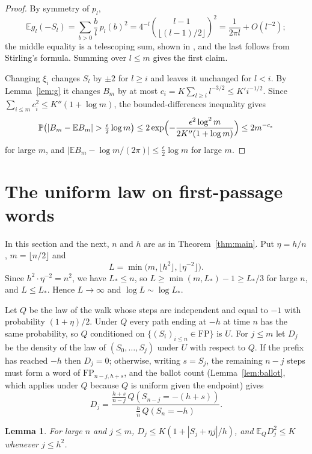\documentclass[11pt]{amsart}
\newtheorem{lemma}[theorem]{Lemma}
\theoremstyle{remark}
\numberwithin{equation}{section}
\newcommand{\PP}{\mathbb{P}}
\newcommand{\EE}{\mathbb{E}}
\newcommand{\FP}{\mathrm{FP}}
\begin{document}
\begin{proof}
By symmetry of $p_l$,
\[
\EE g_l(-S_l)=\sum_{b>0}\frac bl\,p_l(b)^2=4^{-l}\binom{l-1}{\lfloor(l-1)/2\rfloor}^2=\frac1{2\pi l}+O(l^{-2});
\]
the middle equality is a telescoping sum, shown in \cite[Lemma~3.1]{Sh26}, and the last follows from Stirling's formula. Summing over $l\le m$ gives the first claim.

Changing $\xi_i$ changes $S_l$ by $\pm2$ for $l\ge i$ and leaves it unchanged for $l<i$. By Lemma~\ref{lem:g} it changes $B_m$ by at most $c_i=K\sum_{l\ge i}l^{-3/2}\le K'i^{-1/2}$. Since $\sum_{i\le m}c_i^2\le K''(1+\log m)$, the bounded-differences inequality \cite{McD89} gives
\[
\PP\bigl(|B_m-\EE B_m|>\tfrac\epsilon2\log m\bigr)\le2\exp\Bigl(-\frac{\epsilon^2\log^2m}{2K''(1+\log m)}\Bigr)\le2m^{-c_\epsilon}
\]
for large $m$, and $|\EE B_m-\log m/(2\pi)|\le\frac\epsilon2\log m$ for large $m$.
\end{proof}


\section{The uniform law on first-passage words}\label{sec:prefix}

In this section and the next, $n$ and $h$ are as in Theorem~\ref{thm:main}. Put $\eta=h/n$, $m=\lfloor n/2\rfloor$ and
\[
L=\min\bigl(m,\lfloor h^2\rfloor,\lfloor\eta^{-2}\rfloor\bigr).
\]
Since $h^2\cdot\eta^{-2}=n^2$, we have $L_*\le n$, so $L\ge\min(m,L_*)-1\ge L_*/3$ for large $n$, and $L\le L_*$. Hence $L\to\infty$ and $\log L\sim\log L_*$.

Let $Q$ be the law of the walk whose steps are independent and equal to $-1$ with probability $(1+\eta)/2$. Under $Q$ every path ending at $-h$ at time $n$ has the same probability, so $Q$ conditioned on $\{(S_i)_{i\le n}\in\FP\}$ is $U$. For $j\le m$ let $D_j$ be the density of the law of $(S_0,\dots,S_j)$ under $U$ with respect to $Q$. If the prefix has reached $-h$ then $D_j=0$; otherwise, writing $s=S_j$, the remaining $n-j$ steps must form a word of $\FP_{n-j,h+s}$, and the ballot count (Lemma~\ref{lem:ballot}, which applies under $Q$ because $Q$ is uniform given the endpoint) gives
\begin{equation}\label{eq:density}
D_j=\frac{\frac{h+s}{n-j}\,Q(S_{n-j}=-(h+s))}{\frac hn\,Q(S_n=-h)}.
\end{equation}

\begin{lemma}\label{lem:D}
For large $n$ and $j\le m$, $D_j\le K(1+|S_j+\eta j|/h)$, and $\EE_QD_j^2\le K$ whenever $j\le h^2$.
\end{lemma}
\end{document}
